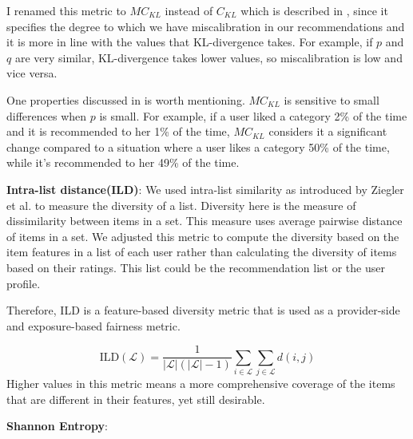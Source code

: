         I renamed this metric to $MC_{KL}$ instead of $C_{KL}$ which is described in \cite{steck2018calibrated}, since it specifies the degree to which we have miscalibration in our recommendations and it is more in line with the values that KL-divergence takes. For example, if $p$ and $q$ are very similar, KL-divergence takes lower values, so miscalibration is low and vice versa.
        
        One properties discussed in \cite{steck2018calibrated} is worth mentioning. $MC_{KL}$ is sensitive to small differences when $p$ is small. For example, if a user liked a category 2\% of the time and it is recommended to her 1\% of the time, $MC_{KL}$ considers it a significant change compared to a situation where a user likes a category 50\% of the time, while it's recommended to her 49\% of the time. 
    


        \textbf{Intra-list distance(ILD)}: We used intra-list similarity as introduced by Ziegler et al. \cite{ziegler2005improving} to measure the diversity of a list. Diversity here is the measure of dissimilarity between items in a set. This measure uses average pairwise distance of items in a set. We adjusted this metric to compute the diversity based on the item features in a list of each user rather than calculating the diversity of items based on their ratings. This list could be the recommendation list or the user profile.
        
        Therefore, ILD is a feature-based diversity metric that is used as a provider-side and exposure-based fairness metric.
        
        
        \begin{equation}
            \text{ILD}(\mathcal{L}) = \frac{1} {|\mathcal{L}|(|\mathcal{L}|-1)} \sum_{i \in \mathcal{L}}\sum_{j \in \mathcal{L}}d(i,j)
        \end{equation}
        Higher values in this metric means a more comprehensive coverage of the items that are different in their features, yet still desirable.




        \textbf{Shannon Entropy}:
        
